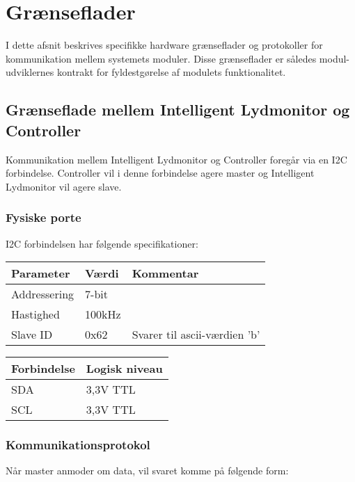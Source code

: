 
\section{Grænseflader}
I dette afsnit beskrives specifikke hardware grænseflader og protokoller for kommunikation mellem systemets moduler. Disse grænseflader er således modul-udviklernes kontrakt for fyldestgørelse af modulets funktionalitet.

\subsection{Grænseflade mellem Intelligent Lydmonitor og Controller}
Kommunikation mellem Intelligent Lydmonitor og Controller foregår via en I2C forbindelse. Controller vil i denne forbindelse agere  master og Intelligent Lydmonitor vil agere slave.

\subsubsection*{Fysiske porte}

I2C forbindelsen har følgende specifikationer:
\begin{center}
    \begin{tabular}{ | l | l | l |}
    \hline
    \textbf{Parameter} 	& \textbf{Værdi} 	& \textbf{Kommentar} 				\\ \hline
    Addressering 		& 7-bit 			&   								\\ \hline
    Hastighed 			& 100kHz 			& 									\\ \hline
    Slave ID 			& 0x62 				& Svarer til ascii-værdien 'b'		\\ \hline
    \end{tabular}
\end{center}

\begin{center}
    \begin{tabular}{ | l | l |}
    \hline
    \textbf{Forbindelse} 	& \textbf{Logisk niveau} 	\\ \hline
    SDA 					& 3,3V TTL 					\\ \hline
    SCL 					& 3,3V TTL					\\ \hline
    \end{tabular}
\end{center}


\subsubsection*{Kommunikationsprotokol}
Når master anmoder om data, vil svaret komme på følgende form:



